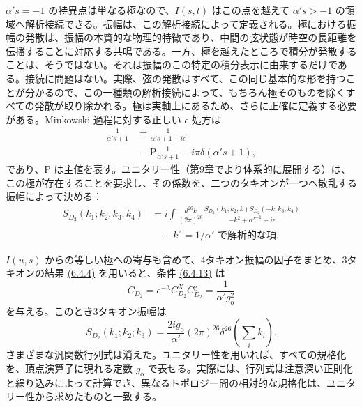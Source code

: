 $\alpha's=-1$ の特異点は単なる極なので、$I(s,t)$ はこの点を越えて $\alpha's>-1$ の領域へ解析接続できる。振幅は、この解析接続によって定義される。極における振幅の発散は、振幅の本質的な物理的特徴であり、中間の弦状態が時空の長距離を伝播することに対応する共鳴である。一方、極を越えたところで積分が発散することは、そうではない。それは振幅のこの特定の積分表示に由来するだけである。接続に問題はない。実際、弦の発散はすべて、この同じ基本的な形を持つことが分かるので、この一種類の解析接続によって、もちろん極そのものを除くすべての発散が取り除かれる。極は実軸上にあるため、さらに正確に定義する必要がある。Minkowski 過程に対する正しい $\epsilon$ 処方は
\begin{equation}
\begin{aligned}
\frac1{\alpha's+1}&\equiv\frac1{\alpha's+1+i\epsilon}\\
&\equiv\mathrm P\frac1{\alpha's+1}-i\pi\delta(\alpha's+1),
\end{aligned}
\tag{6.4.12}\label{eq:6.4.12}
\end{equation}
であり、$\mathrm P$ は主値を表す。ユニタリー性（第9章でより体系的に展開する）は、この極が存在することを要求し、その係数を、二つのタキオンが一つへ散乱する振幅によって決める：
\begin{equation}
\begin{aligned}
S_{D_2}(k_1;k_2;k_3;k_4)
&=i\int\frac{d^{26}k}{(2\pi)^{26}}
\frac{S_{D_2}(k_1;k_2;k)S_{D_2}(-k;k_3;k_4)}{-k^2+\alpha'^{-1}+i\epsilon}\\
&\quad+\text{$k^2=1/\alpha'$ で解析的な項}.
\end{aligned}
\tag{6.4.13}\label{eq:6.4.13}
\end{equation}

$I(u,s)$ からの等しい極への寄与も含めて、4タキオン振幅の因子をまとめ、3タキオンの結果 \hyperref[eq:6.4.4]{(6.4.4)} を用いると、条件 \hyperref[eq:6.4.13]{(6.4.13)} は
\begin{equation}
C_{D_2}=e^{-\lambda}C_{D_2}^XC_{D_2}^{\mathrm g}
=\frac1{\alpha'g_{\mathrm o}^2}
\tag{6.4.14}\label{eq:6.4.14}
\end{equation}
を与える。このとき3タキオン振幅は
\begin{equation}
S_{D_2}(k_1;k_2;k_3)=\frac{2ig_{\mathrm o}}{\alpha'}(2\pi)^{26}\delta^{26}\!\left(\sum_i k_i\right).
\tag{6.4.15}\label{eq:6.4.15}
\end{equation}
さまざまな汎関数行列式は消えた。ユニタリー性を用いれば、すべての規格化を、頂点演算子に現れる定数 $g_{\mathrm o}$ で表せる。実際には、行列式は注意深い正則化と繰り込みによって計算でき、異なるトポロジー間の相対的な規格化は、ユニタリー性から求めたものと一致する。


